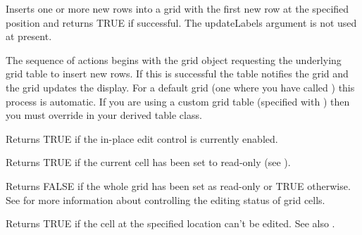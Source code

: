 \label{wxgridinsertrows}


Inserts one or more new rows into a grid with the first new row at the specified
position and returns TRUE if successful. The updateLabels argument is not used at
present. 

The sequence of actions begins with the grid object requesting the underlying grid
table to insert new rows. If this is successful the table notifies the grid and the
grid updates the display. For a default grid (one where you have called 
) this process is automatic. If you are
using a custom grid table (specified with ) 
then you must override 
 in your derived
table class.

\label{wxgridiscelleditcontrolenabled}


Returns TRUE if the in-place edit control is currently enabled.

\label{wxgridiscurrentcellreadonly}


Returns TRUE if the current cell has been set to read-only
(see ).

\label{wxgridiseditable}


Returns FALSE if the whole grid has been set as read-only or TRUE otherwise.
See  for more information about
controlling the editing status of grid cells.

\label{wxgridisreadonly}


Returns TRUE if the cell at the specified location can't be edited.
See also .

\label{wxgridisselection}

